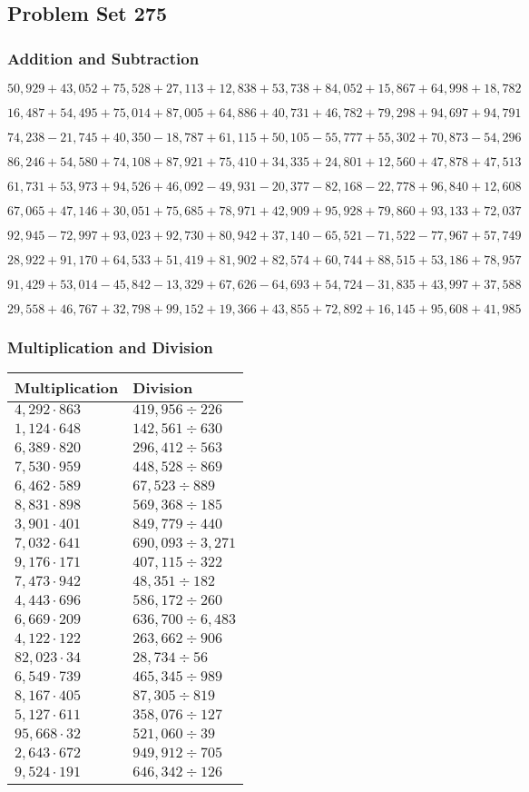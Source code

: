\hypertarget{problem-set-275}{%
\subsection{Problem Set 275}\label{problem-set-275}}

\hypertarget{addition-and-subtraction}{%
\subsubsection{Addition and
Subtraction}\label{addition-and-subtraction}}

\(50,929+43,052+75,528+27,113+12,838+53,738+84,052+15,867+64,998+18,782\)

\(16,487+54,495+75,014+87,005+64,886+40,731+46,782+79,298+94,697+94,791\)

\(74,238-21,745+40,350-18,787+61,115+50,105-55,777+55,302+70,873-54,296\)

\(86,246+54,580+74,108+87,921+75,410+34,335+24,801+12,560+47,878+47,513\)

\(61,731+53,973+94,526+46,092-49,931-20,377-82,168-22,778+96,840+12,608\)

\(67,065+47,146+30,051+75,685+78,971+42,909+95,928+79,860+93,133+72,037\)

\(92,945-72,997+93,023+92,730+80,942+37,140-65,521-71,522-77,967+57,749\)

\(28,922+91,170+64,533+51,419+81,902+82,574+60,744+88,515+53,186+78,957\)

\(91,429+53,014-45,842-13,329+67,626-64,693+54,724-31,835+43,997+37,588\)

\(29,558+46,767+32,798+99,152+19,366+43,855+72,892+16,145+95,608+41,985\)

\hypertarget{multiplication-and-division}{%
\subsubsection{Multiplication and
Division}\label{multiplication-and-division}}

\begin{longtable}[]{@{}ll@{}}
\toprule
Multiplication & Division\tabularnewline
\midrule
\endhead
\(4,292\cdot863\) & \(419,956÷226\)\tabularnewline
\(1,124\cdot648\) & \(142,561÷630\)\tabularnewline
\(6,389\cdot820\) & \(296,412÷563\)\tabularnewline
\(7,530\cdot959\) & \(448,528÷869\)\tabularnewline
\(6,462\cdot589\) & \(67,523÷889\)\tabularnewline
\(8,831\cdot898\) & \(569,368÷185\)\tabularnewline
\(3,901\cdot401\) & \(849,779÷440\)\tabularnewline
\(7,032\cdot641\) & \(690,093÷3,271\)\tabularnewline
\(9,176\cdot171\) & \(407,115÷322\)\tabularnewline
\(7,473\cdot942\) & \(48,351÷182\)\tabularnewline
\(4,443\cdot696\) & \(586,172÷260\)\tabularnewline
\(6,669\cdot209\) & \(636,700÷6,483\)\tabularnewline
\(4,122\cdot122\) & \(263,662÷906\)\tabularnewline
\(82,023\cdot34\) & \(28,734÷56\)\tabularnewline
\(6,549\cdot739\) & \(465,345÷989\)\tabularnewline
\(8,167\cdot405\) & \(87,305÷819\)\tabularnewline
\(5,127\cdot611\) & \(358,076÷127\)\tabularnewline
\(95,668\cdot32\) & \(521,060÷39\)\tabularnewline
\(2,643\cdot672\) & \(949,912÷705\)\tabularnewline
\(9,524\cdot191\) & \(646,342÷126\)\tabularnewline
\bottomrule
\end{longtable}
